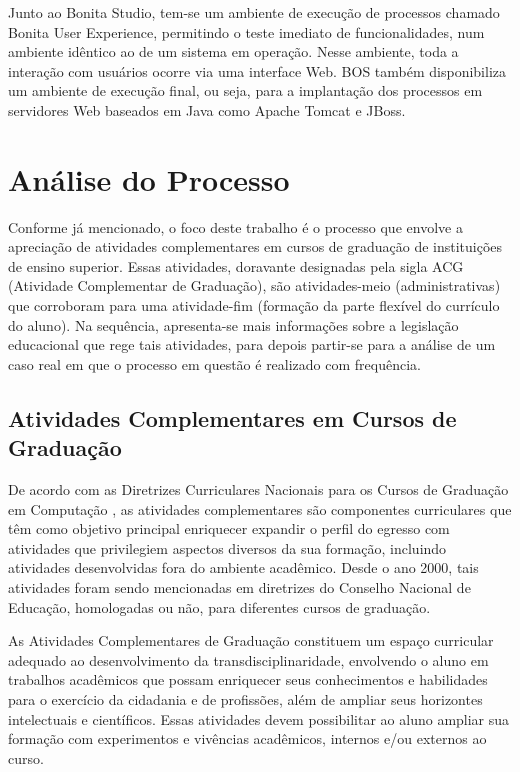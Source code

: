 \documentclass[12pt]{article}
\begin{document}
Junto ao Bonita Studio, tem-se um ambiente de execução de processos chamado Bonita User Experience, permitindo o teste imediato de funcionalidades, num ambiente idêntico ao de um sistema em operação. Nesse ambiente, toda a interação com usuários ocorre via uma interface Web. BOS também disponibiliza um ambiente de execução final, ou seja, para a implantação dos processos em servidores Web baseados em Java como Apache Tomcat e JBoss.

\section{Análise do Processo}\label{s:analise}

Conforme já mencionado, o foco deste trabalho é o processo que envolve a apreciação de atividades complementares em cursos de graduação de instituições de ensino superior. Essas atividades, doravante designadas pela sigla ACG (Atividade Complementar de Graduação), são atividades-meio (administrativas) que corroboram para uma atividade-fim (formação da parte flexível do currículo do aluno). Na sequência, apresenta-se mais informações sobre a legislação educacional que rege tais atividades, para depois partir-se para a análise de um caso real em que o processo em questão é realizado com frequência.

\subsection{Atividades Complementares em Cursos de Graduação}

De acordo com as Diretrizes Curriculares Nacionais para os Cursos de Graduação em Computação \cite{parecer:136}, as atividades complementares são componentes curriculares que têm como objetivo principal enriquecer expandir o perfil do egresso com atividades que privilegiem aspectos diversos da sua formação, incluindo atividades desenvolvidas fora do ambiente acadêmico. Desde o ano 2000, tais atividades foram sendo mencionadas em diretrizes do Conselho Nacional de Educação, homologadas ou não, para diferentes cursos de graduação.

	As Atividades Complementares de Graduação constituem um espaço curricular adequado ao desenvolvimento da transdisciplinaridade, envolvendo o aluno em trabalhos acadêmicos que possam enriquecer seus conhecimentos e habilidades para o exercício da cidadania e de profissões, além de ampliar seus horizontes intelectuais e científicos. Essas atividades devem possibilitar ao aluno ampliar sua formação com experimentos e vivências acadêmicos, internos e/ou externos ao curso.
\end{document}
